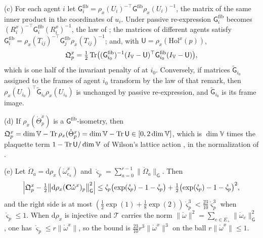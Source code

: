(c) For each agent $i$ let
$\mathsf G^{\mathrm{fib}}_i=\rho_x(U_i)^{-\top}\mathsf G^{\mathrm{fib}}\rho_x(U_i)^{-1}$, the matrix of
the same inner product in the coordinates of $u_i$. Under passive re-expression
$\mathsf G^{\mathrm{fib}}_i$ becomes $(R^x_i)^{-\top}\mathsf G^{\mathrm{fib}}_i(R^x_i)^{-1}$, the law of
; the matrices of different agents satisfy
$\mathsf G^{\mathrm{fib}}_i=\rho_x(T_{ij})^{-\top}\mathsf G^{\mathrm{fib}}_j\rho_x(T_{ij})^{-1}$; and, with
$\mathsf U=\rho_x(\mathrm{Hol}^x(p))$,
\begin{equation}
\mathfrak Q^x_p=\tfrac12\operatorname{Tr}\bigl((\mathsf G^{\mathrm{fib}}_{i_0})^{-1}(I_{\mathbb V}-\mathsf U)^\top\mathsf G^{\mathrm{fib}}_{i_0}(I_{\mathbb V}-\mathsf U)\bigr),
\label{eq:link-defect-local}
\end{equation}
which is one half of the invariant penalty of  at $i_0$. Conversely, if
matrices $\widetilde{\mathsf G}_{i_0}$ assigned to the frames of agent $i_0$ transform by the law of that
remark, then $\rho_x(U_{i_0})^\top\widetilde{\mathsf G}_{i_0}\rho_x(U_{i_0})$ is unchanged by passive
re-expression, and $\widetilde{\mathsf G}_{i_0}$ is its frame image.

(d) If $\rho_x(\mathring\Theta^x_p)$ is a $\mathsf G^{\mathrm{fib}}$-isometry, then
$\mathfrak Q^x_p=\dim\mathbb V-\operatorname{Tr}\rho_x(\mathring\Theta^x_p)=\dim\mathbb V-\operatorname{Tr}\mathsf U\in[0,2\dim\mathbb V]$,
which is $\dim\mathbb V$ times the plaquette term $1-\operatorname{Tr}\mathsf U/\dim\mathbb V$ of Wilson's lattice
action \citep[Eq.~(3.29)]{WilsonConfinement1974}, in the normalization of
\citet[Ch.~7, Eq.~(7.6)]{Creutz1983}.

(e) Let $\mathring\Omega_a=\mathrm d\rho_x(\mathring\omega^x_{e_a})$ and
$\mathring\varsigma_p=\sum_{a=0}^{r-1}\lVert\mathring\Omega_a\rVert_{\mathsf G}$. Then
\begin{equation}
\Bigl\lvert\mathfrak Q^x_p-\tfrac12\bigl\lVert\mathrm d\rho_x(\mathbf C\mathring\omega^x)_p\bigr\rVert^2_{\mathsf G}\Bigr\rvert
\leq\mathring\varsigma_p\bigl(\exp(\mathring\varsigma_p)-1-\mathring\varsigma_p\bigr)
+\tfrac12\bigl(\exp(\mathring\varsigma_p)-1-\mathring\varsigma_p\bigr)^2,
\label{eq:link-defect-expansion}
\end{equation}
and the right side is at most
$(\tfrac12\exp(1)+\tfrac18\exp(2))\mathring\varsigma_p^3<\tfrac{23}{10}\mathring\varsigma_p^3$ when
$\mathring\varsigma_p\leq1$. When $\mathrm d\rho_x$ is injective and $\mathscr T$ carries the norm
$\lVert\mathring\omega\rVert^2=\sum_{e\in E_+}\lVert\mathring\omega_e\rVert^2_{\mathsf G}$, one has
$\mathring\varsigma_p\leq r\lVert\mathring\omega^x\rVert$, so the bound is
$\tfrac{23}{10}r^3\lVert\mathring\omega^x\rVert^3$ on the ball $r\lVert\mathring\omega^x\rVert\leq1$.

